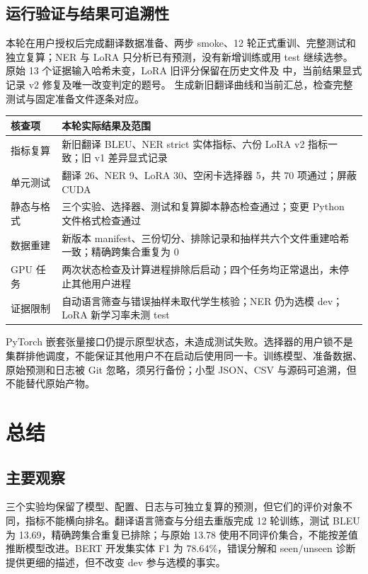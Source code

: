 \documentclass[UTF8,a4paper,12pt,fontset=none]{ctexart}
\begin{document}
\subsection{运行验证与结果可追溯性}
本轮在用户授权后完成翻译数据准备、两步 smoke、12 轮正式重训、完整测试和独立复算；NER 与 LoRA 只分析已有预测，没有新增训练或用 test 继续选参。原始 13 个证据输入哈希未变，LoRA 旧评分保留在历史文件及  中，当前结果显式记录 v2 修复及唯一改变判定的题号。 生成新旧翻译曲线和当前汇总，检查完整测试与固定准备文件逐条对应。

\noindent\begin{tabularx}{\textwidth}{>{\raggedright\arraybackslash}p{}Y}
\toprule
核查项 & 本轮实际结果及范围 \\
\midrule
指标复算 & 新旧翻译 BLEU、NER strict 实体指标、六份 LoRA v2 指标一致；旧 v1 差异显式记录 \\
单元测试 & 翻译 26、NER 9、LoRA 30、空闲卡选择器 5，共 70 项通过；屏蔽 CUDA \\
静态与格式 & 三个实验、选择器、测试和复算脚本静态检查通过；变更 Python 文件格式检查通过 \\
数据重建 & 新版本 manifest、三份切分、排除记录和抽样共六个文件重建哈希一致；精确跨集合重复为 0 \\
GPU 任务 & 两次状态检查及计算进程排除后启动；四个任务均正常退出，未停止其他用户进程 \\
证据限制 & 自动语言筛查与错误抽样未取代学生核验；NER 仍为选模 dev；LoRA 新学习率未测 test \\
\bottomrule
\end{tabularx}

PyTorch 嵌套张量接口仍提示原型状态，未造成测试失败。选择器的用户锁不是集群排他调度，不能保证其他用户不在启动后使用同一卡。训练模型、准备数据、原始预测和日志被 Git 忽略，须另行备份；小型 JSON、CSV 与源码可追溯，但不能替代原始产物。

\section{总结}
\subsection{主要观察}
三个实验均保留了模型、配置、日志与可独立复算的预测，但它们的评价对象不同，指标不能横向排名。翻译语言筛查与分组去重版完成 12 轮训练，测试 BLEU 为 13.69，精确跨集合重复已排除；与原始 13.78 使用不同评价集合，不能按差值推断模型改进。BERT 开发集实体 F1 为 78.64\%，错误分解和 seen/unseen 诊断提供更细的描述，但不改变 dev 参与选模的事实。
\end{document}
